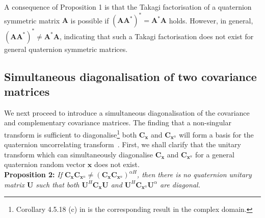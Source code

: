 \documentclass[review]{elsarticle}
\theoremstyle{plain}
\theoremstyle{remark}
\theoremstyle{plain}
\theoremstyle{definition}
\theoremstyle{prop}
\theoremstyle{definition}
\theoremstyle{plain}
\theoremstyle{plain}
\begin{document}
A consequence of Proposition 1 is that the Takagi factorisation of a quaternion symmetric matrix $\mathbf{A}$ is possible if $(\mathbf{AA^*})^*=\mathbf{A}^*\mathbf{A}$ holds. However, in general, $(\mathbf{AA^*})^*\neq\mathbf{A}^*\mathbf{A}$, indicating that such a Takagi factorisation does not exist for general quaternion symmetric matrices.
%
\subsection{Simultaneous diagonalisation of two covariance matrices} \label{sec Q-SUT}
We next proceed to introduce a simultaneous diagonalisation of the covariance and complementary covariance matrices. The finding that a non-singular transform is sufficient to diagonalise\footnote{Corollary 4.5.18 (c) in \cite{horn1990matrix} is the corresponding result in the complex domain.} both $\mathbf{C}_\mathbf{x}$ and $\mathbf{C}_{\mathbf{x}^{\alpha}}$ will form a basis for the quaternion uncorrelating transform~\cite{ShirinICASSP}. First, we shall clarify that the unitary transform which can simultaneously diagonalise $\mathbf{C}_\mathbf{x}$ and $\mathbf{C}_{\mathbf{x}^{\alpha}}$ for a general quaternion random vector $\mathbf{x}$ does not exist.
\\\textbf{Proposition 2:} \emph{If $\mathbf{C}_\mathbf{x}\mathbf{C}_{\mathbf{x}^{\alpha}}\neq(\mathbf{C}_\mathbf{x}\mathbf{C}_{\mathbf{x}^{\alpha}})^{\alpha H}$, then there is no quaternion unitary matrix $\mathbf{U}$ such that both $\mathbf{U}^H\mathbf{C}_\mathbf{x}\mathbf{U}$ and $\mathbf{U}^{H}\mathbf{C}_{\mathbf{x}^{\alpha}}\mathbf{U}^\alpha$ are diagonal.}
\end{document}
